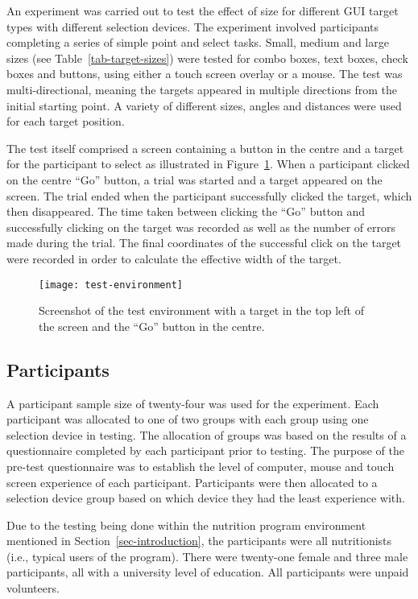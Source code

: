\documentclass{elsart}
\begin{document}
An experiment was carried out to test the effect of size for different
GUI target types with different selection devices. The experiment
involved participants completing a series of simple point and select
tasks. Small, medium and large sizes (see Table~\ref{tab-target-sizes})
were tested for combo boxes, text boxes, check boxes and buttons, using
either a touch screen overlay or a mouse. The test was
multi-directional, meaning the targets appeared in multiple directions
from the initial starting point. A variety of different sizes, angles
and distances were used for each target position.

The test itself comprised a screen containing a button in the centre and
a target for the participant to select as illustrated in
Figure~\ref{fig-test-environment}. When a participant clicked on the
centre ``Go'' button, a trial was started and a target appeared on the
screen. The trial ended when the participant successfully clicked the
target, which then disappeared. The time taken between clicking the
``Go'' button and successfully clicking on the target was recorded as
well as the number of errors made during the trial. The final
coordinates of the successful click on the target were recorded in order
to calculate the effective width of the target.


\begin{figure}
	\centering
 	\texttt{[image: test-environment]}
	\caption{Screenshot of the test environment with a target in the
	top left of the screen and the ``Go'' button in the centre.}
	\label{fig-test-environment}
\end{figure}


\subsection{Participants}
\label{sec-method-participants}

A participant sample size of twenty-four was used for the experiment.
Each participant was allocated to one of two groups with each group
using one selection device in testing. The allocation of groups was
based on the results of a questionnaire completed by each participant
prior to testing. The purpose of the pre-test questionnaire was to
establish the level of computer, mouse and touch screen experience of
each participant. Participants were then allocated to a selection device
group based on which device they had the least experience with.

Due to the testing being done within the nutrition program environment
mentioned in Section~\ref{sec-introduction}, the participants were all
nutritionists (i.e., typical users of the program). There were
twenty-one female and three male participants, all with a university
level of education. All participants were unpaid volunteers.
\end{document}
